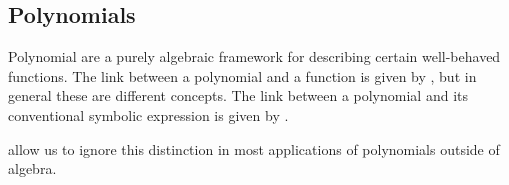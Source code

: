\subsection{Polynomials}\label{subsec:polynomials}

\begin{remark}\label{rem:polynomials_vs_polynomial_functions}
  Polynomial are a purely algebraic framework for describing certain well-behaved functions. The link between a polynomial and a function is given by , but in general these are different concepts. The link between a polynomial and its conventional symbolic expression is given by .

   allow us to ignore this distinction in most applications of polynomials outside of algebra.
\end{remark}

